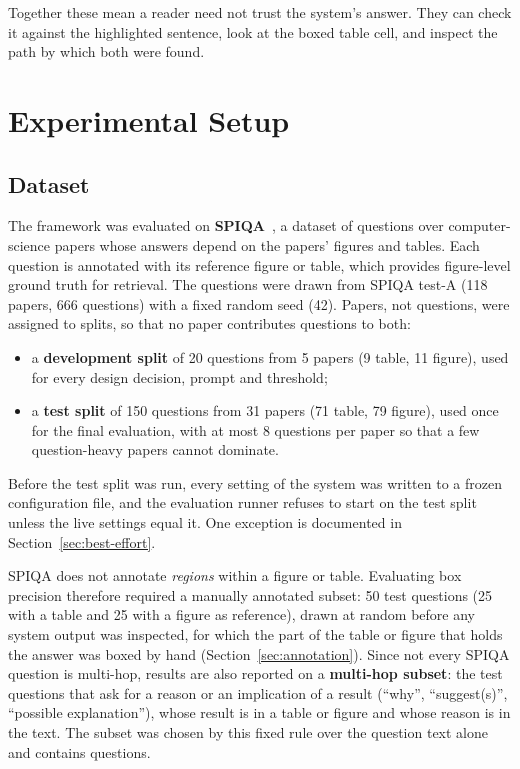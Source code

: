 Together these mean a reader need not trust the system's answer. They can check it
against the highlighted sentence, look at the boxed table cell, and inspect the path
by which both were found.

\section{Experimental Setup}
\label{sec:setup}

\subsection{Dataset}

The framework was evaluated on \textbf{SPIQA}~\cite{pramanick2024spiqa}, a dataset of
questions over computer-science papers whose answers depend on the papers' figures and
tables. Each question is annotated with its reference figure or table, which provides
figure-level ground truth for retrieval. The questions were drawn from SPIQA test-A
(118 papers, 666 questions) with a fixed random seed (42). Papers, not questions, were
assigned to splits, so that no paper contributes questions to both:

\begin{itemize}
    \item a \textbf{development split} of 20 questions from 5 papers (9 table, 11 figure),
    used for every design decision, prompt and threshold;
    \item a \textbf{test split} of 150 questions from 31 papers (71 table, 79 figure),
    used once for the final evaluation, with at most 8 questions per paper so that a
    few question-heavy papers cannot dominate.
\end{itemize}

\noindent Before the test split was run, every setting of the system was written to a
frozen configuration file, and the evaluation runner refuses to start on the test split
unless the live settings equal it. One exception is documented in
Section~\ref{sec:best-effort}.

SPIQA does not annotate \emph{regions} within a figure or table. Evaluating box
precision therefore required a manually annotated subset: 50 test questions (25 with a
table and 25 with a figure as reference), drawn at random before any system output was
inspected, for which the part of the table or figure that holds the answer was boxed by
hand (Section~\ref{sec:annotation}). Since not every SPIQA question is multi-hop,
results are also reported on a \textbf{multi-hop subset}: the test questions that ask
for a reason or an implication of a result (``why'', ``suggest(s)'', ``possible
explanation''), whose result is in a table or figure and whose reason is in the text.
The subset was chosen by this fixed rule over the question text alone and contains
\nMultihopN{} questions.

